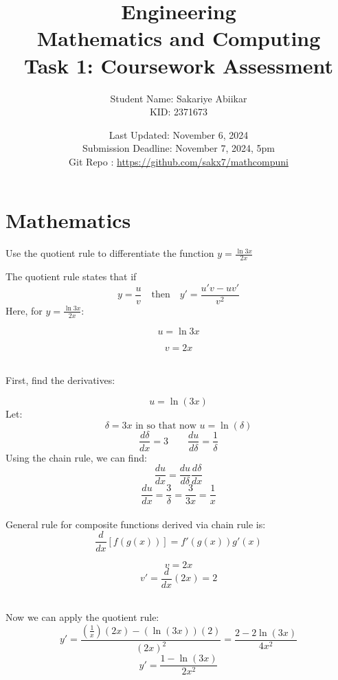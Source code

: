 \documentclass[a4paper, 12pt]{report}
\title{\vspace{3em} \Huge \textbf{Engineering\\ Mathematics and Computing}\\ \vspace{1em} \Large Task 1: Coursework Assessment}
\author{Student Name: Sakariye Abiikar\\ KID: 2371673}
\date{Last Updated: November 6, 2024\\ Submission Deadline: November 7, 2024, 5pm \\[1em] Git Repo : \color{blue}\url{https://github.com/sakx7/mathcompuni}}
\def\ni{blue!20!white}
\begin{document}
    
    \maketitle
    \thispagestyle{empty}
    
    \newpage
    \thispagestyle{empty}

    \chapter{Mathematics}
    
    \newpage\centering\restoregeometry
    
    \setcounter{page}{1}

    \begin{tcolorbox}[title={\color{black}{\section{Q1}}}, colback=white, colframe=\ni, boxrule=1mm, width=1\textwidth]
        Use the quotient rule to differentiate the function \( y=\frac{\ln 3 x}{2 x} \)
    \end{tcolorbox}
    
    The quotient rule states that if
    \[y = \frac{u}{v} \quad \text{then} \quad y' = \frac{u'v - uv'}{v^2}\]
    Here, for \(y=\frac{\ln 3 x}{2 x}\): \\[5pt]
    \begin{minipage}{0.4\textwidth}
        \[u = \ln 3x\] 
    \end{minipage}\hspace{-8em}
    \begin{minipage}{0.4\textwidth}
        \[v = 2x \]
    \end{minipage}\\[20pt]
    First, find the derivatives:\\[10pt]
    \begin{minipage}{0.43\textwidth}\centering
    \[u = \ln(3x)\]
    Let:
    \[\delta = 3x \text{ in so that now } u = \ln(\delta)\]
    \[\frac{d\delta}{dx} = 3 \qquad \frac{du}{d\delta} = \frac{1}{\delta} \]
    Using the chain rule, we can find:
    \[\frac{du}{dx} = \frac{du}{d\delta} \frac{d\delta}{dx}\]
    \[\frac{du}{dx} = \frac{3}{\delta} = \frac{3}{3x}= \frac{1}{x}\]\\[1em]
    General rule for composite functions derived via chain rule is:\\[-20pt]
    \[\frac{d}{dx}\left[f(g(x))\right] = f'(g(x)) g'(x)\]
    \end{minipage}\hspace{1em}\vrule\hspace{-2.5em}
    \begin{minipage}{0.4\textwidth}
        \[v = 2x\]
        \[v' = \frac{d}{dx}(2x) = 2\]
    \end{minipage}\\[30pt]
    Now we can apply the quotient rule:
    \[y' = \frac{\left(\frac{1}{x}\right)(2x) - (\ln(3x))(2)}{(2x)^2} = \frac{2 - 2\ln (3x)}{4x^2}\]
    \[\boxed{y' = \frac{1 - \ln(3x)}{2x^2}}\]
    
\end{document}
